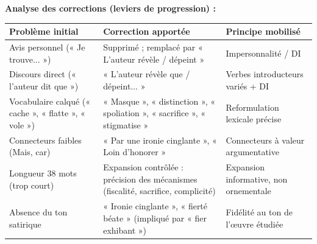 \documentclass[11pt]{article}
\begin{document}
\begin{exoresolu}
\medskip
\textbf{Analyse des corrections (leviers de progression) :}
\begin{tabularx}{\linewidth}{|l|X|X|}\hline
\textbf{Problème initial} & \textbf{Correction apportée} & \textbf{Principe mobilisé} \\ \hline
Avis personnel (« Je trouve... ») & Supprimé ; remplacé par « L'auteur révèle / dépeint » & Impersonnalité / DI \\ \hline
Discours direct (« l'auteur dit que ») & « L'auteur révèle que / dépeint... » & Verbes introducteurs variés + DI \\ \hline
Vocabulaire calqué (« cache », « flatte », « vole ») & « Masque », « distinction », « spoliation », « sacrifice », « stigmatise » & Reformulation lexicale précise \\ \hline
Connecteurs faibles (Mais, car) & « Par une ironie cinglante », « Loin d'honorer » & Connecteurs à valeur argumentative \\ \hline
Longueur 38 mots (trop court) & Expansion contrôlée : précision des mécanismes (fiscalité, sacrifice, complicité) & Expansion informative, non ornementale \\ \hline
Absence du ton satirique & « Ironie cinglante », « fierté béate » (impliqué par « fier exhibant ») & Fidélité au ton de l'œuvre étudiée \\ \hline
\end{tabularx}
\end{exoresolu}
\end{document}
